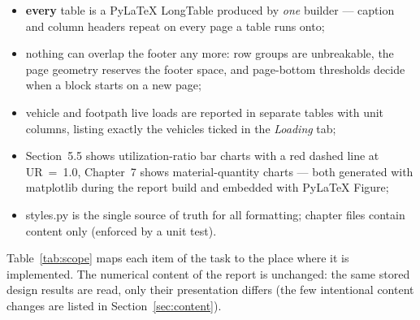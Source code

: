 \documentclass[10pt,a4paper]{article}
\newcommand{\file}[1]{{\footnotesize\ttfamily #1}}
\newcommand{\code}[1]{{\small\ttfamily #1}}
\begin{document}
\begin{itemize}
\item \textbf{every} table is a PyLaTeX \code{LongTable} produced by \emph{one} builder --- caption and column headers repeat on every page a table runs onto;
\item nothing can overlap the footer any more: row groups are unbreakable, the page geometry reserves the footer space, and page-bottom thresholds decide when a block starts on a new page;
\item vehicle and footpath live loads are reported in separate tables with unit columns, listing exactly the vehicles ticked in the \emph{Loading} tab;
\item Section~5.5 shows utilization-ratio bar charts with a red dashed line at UR~=~1.0, Chapter~7 shows material-quantity charts --- both generated with matplotlib during the report build and embedded with PyLaTeX \code{Figure};
\item \file{styles.py} is the single source of truth for all formatting; chapter files contain content only (enforced by a unit test).
\end{itemize}

Table~\ref{tab:scope} maps each item of the task to the place where it is implemented.
The numerical content of the report is unchanged: the same stored design results are read, only their presentation differs (the few intentional content changes are listed in Section~\ref{sec:content}).
\end{document}

